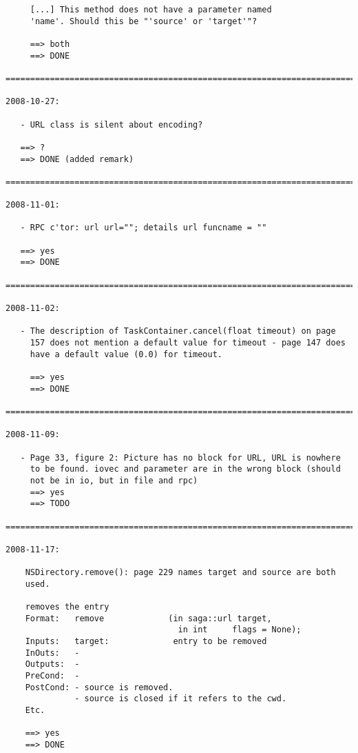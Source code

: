 \documentclass{article}
\begin{document}
\begin{verbatim}
     [...] This method does not have a parameter named
     'name'. Should this be "'source' or 'target'"? 

     ==> both
     ==> DONE

=========================================================================

2008-10-27:

   - URL class is silent about encoding?

   ==> ?
   ==> DONE (added remark)

=========================================================================

2008-11-01:

   - RPC c'tor: url url=""; details url funcname = ""

   ==> yes
   ==> DONE

=========================================================================

2008-11-02:

   - The description of TaskContainer.cancel(float timeout) on page
     157 does not mention a default value for timeout - page 147 does 
     have a default value (0.0) for timeout.

     ==> yes
     ==> DONE

=========================================================================

2008-11-09:

   - Page 33, figure 2: Picture has no block for URL, URL is nowhere
     to be found. iovec and parameter are in the wrong block (should 
     not be in io, but in file and rpc)                                                                                                                   
     ==> yes
     ==> TODO

=========================================================================

2008-11-17:

    NSDirectory.remove(): page 229 names target and source are both
    used.
    
    removes the entry
    Format:   remove             (in saga::url target,
                                   in int     flags = None);
    Inputs:   target:             entry to be removed
    InOuts:   -
    Outputs:  -
    PreCond:  -
    PostCond: - source is removed.
              - source is closed if it refers to the cwd.
    Etc.

    ==> yes
    ==> DONE


\end{verbatim}
\end{document}
